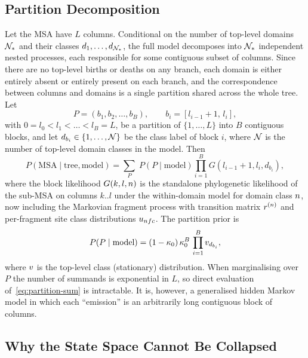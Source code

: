 \subsection{Partition Decomposition}
\label{sec:partition}

Let the MSA have $L$ columns. Conditional on the number of top-level
domains $\mathcal{N}_*$ and their classes $d_1, \dots, d_{\mathcal{N}_*}$,
the full model decomposes into $\mathcal{N}_*$ independent
nested processes, each responsible for some contiguous subset
of columns. Since there are no top-level births or deaths on any
branch, each domain is either entirely absent or entirely present on
each branch, and the correspondence between columns and domains is a
single partition shared across the whole tree. Let
\[
  P = (b_1, b_2, \dots, b_B), \qquad b_i = [l_{i-1}+1,\, l_i],
\]
with $0 = l_0 < l_1 < \dots < l_B = L$, be a partition of
$\{1,\dots,L\}$ into $B$ contiguous blocks, and let $d_{b_i} \in \{1,\dots,\mathcal{N}\}$
be the class label of block $i$, where $\mathcal{N}$ is the number of
top-level domain classes in the model.
Then
\begin{equation}
  P(\text{MSA} \mid \text{tree}, \text{model})
  = \sum_{P}\; P(P \mid \text{model}) \prod_{i=1}^{B} G(l_{i-1}+1, l_i, d_{b_i}),
  \label{eq:partition-sum}
\end{equation}
where the block likelihood $G(k, l, n)$ is the standalone
phylogenetic likelihood of the sub-MSA on columns $k..l$ under
the within-domain model for domain class $n$, now including
the Markovian fragment process with transition matrix $r^{(n)}$
and per-fragment site class distributions $u_{nfc}$.
The partition prior is
\begin{equation}
  P(P \mid \text{model}) = (1-\kappa_0)\, \kappa_0^{B}\,
  \prod_{i=1}^{B} v_{d_{b_i}},
  \label{eq:partition-prior}
\end{equation}
where $v$ is the top-level class (stationary) distribution.
When marginalising over $P$ the number of summands is exponential in
$L$, so direct evaluation of~\eqref{eq:partition-sum} is intractable.
It is, however, a generalised hidden Markov model in which each
``emission'' is an arbitrarily long contiguous block of columns.

\subsection{Why the State Space Cannot Be Collapsed}


